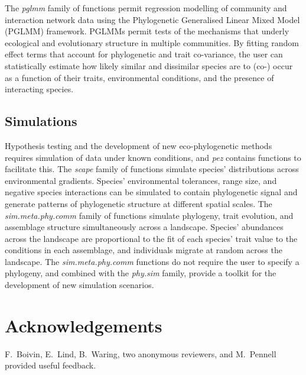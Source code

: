 \documentclass{bioinfo}
\begin{document}
The \emph{pglmm} family of functions permit regression modelling of
community \citep{Ives2011} and interaction network data
\citep{Rafferty2013} using the Phylogenetic Generalised Linear Mixed
Model (PGLMM) framework. PGLMMs permit tests of the mechanisms that
underly ecological and evolutionary structure in multiple
communities. By fitting random effect terms that account for
phylogenetic and trait co-variance, the user can statistically
estimate how likely similar and dissimilar species are to (co-) occur
as a function of their traits, environmental conditions, and the
presence of interacting species.
\subsection{Simulations}
Hypothesis testing and the development of new eco-phylogenetic methods
requires simulation of data under known conditions, and \emph{pez}
contains functions to facilitate this. The \emph{scape} family of
functions \citep[following][]{Helmus2012} simulate species'
distributions across environmental gradients. Species' environmental
tolerances, range size, and negative species interactions can be
simulated to contain phylogenetic signal and generate patterns of
phylogenetic structure at different spatial scales. The
\emph{sim.meta.phy.comm} family of functions simulate phylogeny, trait
evolution, and assemblage structure simultaneously across a landscape.
Species' abundances across the landscape are proportional to the fit
of each species' trait value to the conditions in each assemblage, and
individuals migrate at random across the landscape. The
\emph{sim.meta.phy.comm} functions do not require the user to specify
a phylogeny, and combined with the \emph{phy.sim} family, provide a
toolkit for the development of new simulation scenarios.
\section*{Acknowledgements}
F.\ Boivin, E.\ Lind, B.\ Waring, two anonymous reviewers, and M.\
Pennell provided useful feedback.
\end{document}
